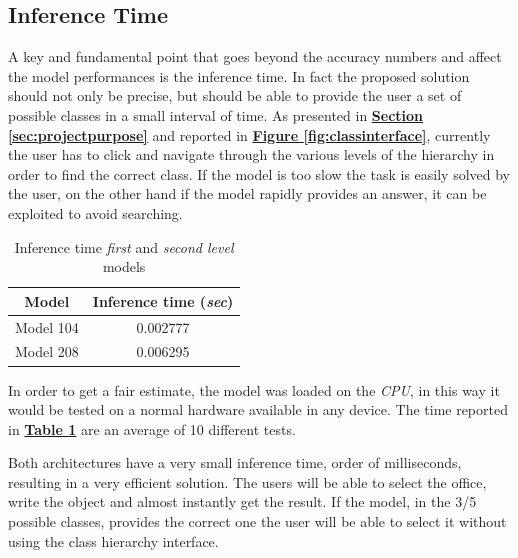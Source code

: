 \documentclass[12pt]{article}
\begin{document}
\subsection{Inference Time}
A key and fundamental point that goes beyond the accuracy numbers and affect the model performances is the inference time. In fact the proposed solution should not only be precise, but should be able to provide the user a set of possible classes in a small interval of time. As presented in  \hyperref[sec:projectpurpose]{\textbf{Section \ref{sec:projectpurpose}}} and reported in \hyperref[fig:classinterface]{\textbf{Figure \ref{fig:classinterface}}}, currently the user has to click and navigate through the various levels of the hierarchy in order to find the correct class. If the model is too slow the task is easily solved by the user, on the other hand if the model rapidly provides an answer, it can be exploited to avoid searching.

\begin{table}[ht!]
    \begin{adjustwidth}{}{}
	    \centering
	    \small
	    \begin{tabular}{ |c|c| }
        \hline
        \textbf{Model} & \textbf{Inference time (\textit{sec})} \\
        \hline
        Model 104 & 0.002777 \\
        Model 208 & 0.006295 \\
        \hline
        \end{tabular}
    \end{adjustwidth}
    \captionsetup{justification   = centering}
    \caption{Inference time \textit{first} and \textit{second level} models}
    \label{tb:inf-time}
\end{table}

In order to get a fair estimate, the model was loaded on the \textit{CPU}, in this way it would be tested on a normal hardware available in any device. The time reported in \hyperref[tb:inf-time]{\textbf{Table \ref{tb:inf-time}}} are an average of 10 different tests.

Both architectures have a very small inference time, order of milliseconds, resulting in a very efficient solution. The users will be able to select the office, write the object and almost instantly get the result. If the model, in the 3/5 possible classes, provides the correct one the user will be able to select it without using the class hierarchy interface.
\end{document}
